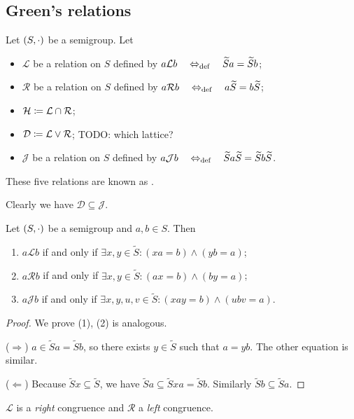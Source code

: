 \subsection{Green's relations}
\begin{definition}
Let $\sSet{S,\cdot}$ be a semigroup. Let
\begin{itemize}
\item $\mathcal{L}$ be a relation on $S$ defined by $a\mathcal{L}b \quad\Leftrightarrow_{\text{def}}\quad \widetilde{S}a = \widetilde{S}b$;
\item $\mathcal{R}$ be a relation on $S$ defined by $a\mathcal{R}b \quad\Leftrightarrow_{\text{def}}\quad a\widetilde{S} = b\widetilde{S}$;
\item $\mathcal{H} \coloneqq \mathcal{L}\cap \mathcal{R}$;
\item $\mathcal{D} \coloneqq \mathcal{L}\vee \mathcal{R}$; TODO: which lattice?
\item $\mathcal{J}$ be a relation on $S$ defined by $a\mathcal{J}b \quad\Leftrightarrow_{\text{def}}\quad \widetilde{S}a\widetilde{S} = \widetilde{S}b\widetilde{S}$.
\end{itemize}
These five relations are known as .
\end{definition}

Clearly we have $\mathcal{D} \subseteq \mathcal{J}$.

\begin{lemma}
Let $\sSet{S,\cdot}$ be a semigroup and $a,b\in S$. Then
\begin{enumerate}
\item $a\mathcal{L}b$ \textup{if and only if} $\exists x,y\in \widetilde{S}: (xa = b) \land (yb = a)$;
\item $a\mathcal{R}b$ \textup{if and only if} $\exists x,y\in \widetilde{S}: (ax = b) \land (by = a)$;
\item $a\mathcal{J}b$ \textup{if and only if} $\exists x,y, u,v\in \widetilde{S}: (xay = b) \land (ubv = a)$.
\end{enumerate}
\end{lemma}
\begin{proof}
We prove (1), (2) is analogous.

($\Rightarrow$) $a\in \widetilde{S}a = \widetilde{S}b$, so there exists $y\in \widetilde{S}$ such that $a = yb$. The other equation is similar.

($\Leftarrow$) Because $\widetilde{S}x \subseteq \widetilde{S}$, we have $\widetilde{S}a \subseteq \widetilde{S}xa = \widetilde{S}b$. Similarly $\widetilde{S}b \subseteq \widetilde{S}a$.
\end{proof}
\begin{corollary}
$\mathcal{L}$ is a \emph{right} congruence and $\mathcal{R}$ a \emph{left} congruence.
\end{corollary}

